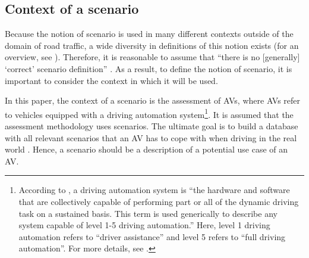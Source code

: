 \subsection{Context of a scenario}
\label{sec:context}

Because the notion of scenario is used in many different contexts \cstartd outside of the domain of road traffic\cendd, a wide diversity in definitions of this notion exists (for an overview, see \autocite{vannotten2003updated, bishop2007scentechniques}). Therefore, it is reasonable to assume that ``there is no [generally] `correct' scenario definition'' \autocite{vannotten2003updated}. As a result, to define the notion of scenario, it is important to consider the context in which it will be used. 

In this paper, the context of a scenario is the assessment of AVs, where AVs refer to vehicles equipped with a driving automation system\footnote{According to \autocite{sae2018j3016}, a driving automation system is ``the hardware and software that are collectively capable of performing part or all of the dynamic driving task on a sustained basis. This term is used generically to describe any system capable of level 1-5 driving automation.'' Here, level 1 driving automation refers to ``driver assistance'' and level 5 refers to ``full driving automation''. For more details, see \autocite{sae2018j3016}.}. 
It is assumed that the assessment methodology uses scenarios. %
The ultimate goal is to build a database with all relevant scenarios that an AV has to cope with when driving in the real world \autocite{putz2017pegasus}. Hence, a scenario should be a description of a potential use case of an AV. 




